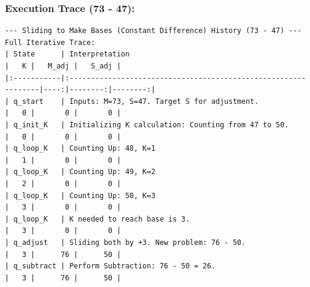 \documentclass[11pt]{article}
\begin{document}
\subsubsection*{Execution Trace (73 - 47):}
\begin{verbatim}
--- Sliding to Make Bases (Constant Difference) History (73 - 47) ---
Full Iterative Trace:
| State      | Interpretation                                                 |   K |   M_adj |   S_adj |
|:-----------|:---------------------------------------------------------------|----:|--------:|--------:|
| q_start    | Inputs: M=73, S=47. Target S for adjustment.                   |   0 |       0 |       0 |
| q_init_K   | Initializing K calculation: Counting from 47 to 50.            |   0 |       0 |       0 |
| q_loop_K   | Counting Up: 48, K=1                                           |   1 |       0 |       0 |
| q_loop_K   | Counting Up: 49, K=2                                           |   2 |       0 |       0 |
| q_loop_K   | Counting Up: 50, K=3                                           |   3 |       0 |       0 |
| q_loop_K   | K needed to reach base is 3.                                   |   3 |       0 |       0 |
| q_adjust   | Sliding both by +3. New problem: 76 - 50.                      |   3 |      76 |      50 |
| q_subtract | Perform Subtraction: 76 - 50 = 26.                             |   3 |      76 |      50 |
\end{verbatim}

\printbibliography
\end{document}
